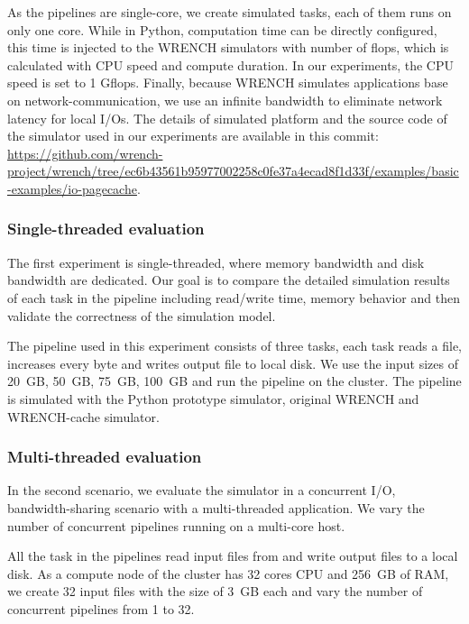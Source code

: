 \documentclass[conference]{IEEEtran}
\begin{document}
            As the pipelines are single-core, we create simulated tasks,
            each of them runs on only one core.
            While in Python, computation time can be directly configured,
            this time is injected to the WRENCH simulators with number of flops,
            which is calculated with CPU speed and compute duration.
            In our experiments, the CPU speed is set to 1 Gflops.
            Finally, because WRENCH simulates applications base on network-communication,
            we use an infinite bandwidth to eliminate network latency for local I/Os.
            The details of simulated platform and the source code of the simulator
            used in our experiments are available in this commit:
            \url{https://github.com/wrench-project/wrench/tree/ec6b43561b95977002258c0fe37a4ecad8f1d33f/examples/basic-examples/io-pagecache}.

            \subsubsection{Single-threaded evaluation}

            The first experiment is single-threaded, where memory bandwidth
            and disk bandwidth are dedicated.
            Our goal is to compare the detailed simulation results of each task
            in the pipeline including read/write time, memory behavior and
            then validate the correctness of the simulation model.

            The pipeline used in this experiment consists of three tasks,
            each task reads a file, increases every byte and writes output file
            to local disk.
            We use the input sizes of 20~GB, 50~GB, 75~GB, 100~GB and run
            the pipeline on the cluster.
            The pipeline is simulated with the Python prototype simulator,
            original WRENCH and WRENCH-cache simulator.

            \subsubsection{Multi-threaded evaluation}

            In the second scenario, we evaluate the simulator in a concurrent I/O, 
            bandwidth-sharing scenario with a multi-threaded application.             
            We vary the number of concurrent pipelines running on a multi-core host.  
            
            All the task in the pipelines read input files from and write output files 
            to a local disk. 
            As a compute node of the cluster has 32 cores CPU and 256~GB of RAM,  
            we create 32 input files with the size of 3~GB each and vary the number of 
            concurrent pipelines from 1 to 32. 
            
\end{document}
